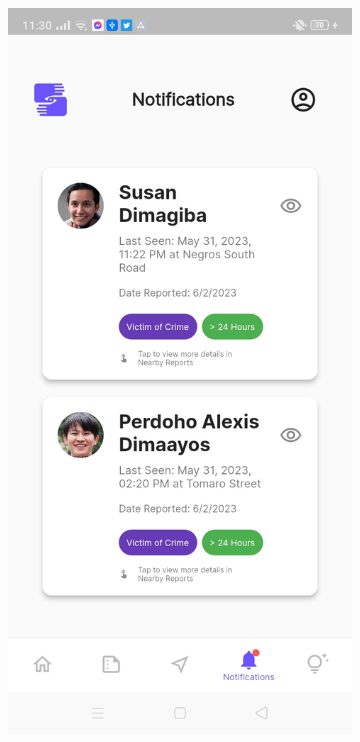 \begin{figure}[!h]
\begin{subfigure}[c]{0.30\linewidth}
        \includegraphics[scale=0.15]{figures/Chapter4/Main/Notifications-1.jpg}
    \end{subfigure}
    \centering
    \begin{subfigure}[c]{0.30\linewidth}

\end{subfigure}
\end{figure}
